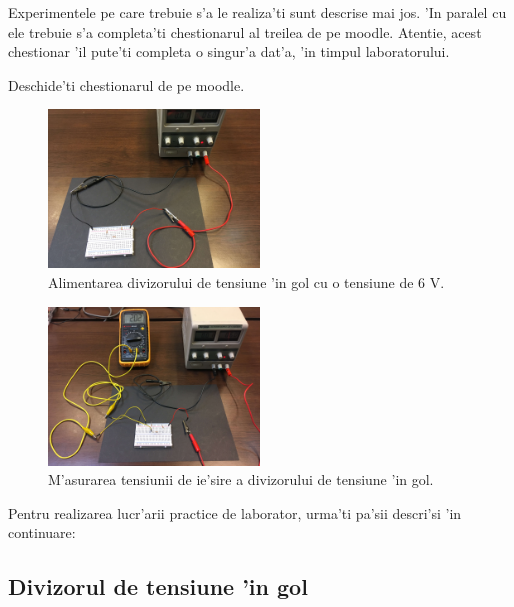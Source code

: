 Experimentele pe care trebuie s'a le realiza'ti sunt descrise mai jos. 'In paralel cu ele trebuie s'a completa'ti chestionarul al treilea de pe moodle. Atentie, acest chestionar 'il pute'ti completa o singur'a dat'a, 'in timpul laboratorului.

\begin{exercise}[La laborator]
	Deschide'ti chestionarul de pe moodle.
\end{exercise}

\begin{figure}[!b]
	\centering
		\includegraphics[width=0.5\textwidth]{figuri/4_divizor_gol_alimentat}
	\caption{Alimentarea divizorului de tensiune 'in gol cu o tensiune de 6 V.}
	\label{fig:4_divizor_gol_alimentat}
\end{figure}
\begin{figure}[!b]
	\centering
		\includegraphics[width=0.5\textwidth]{figuri/4_divizor_gol_tensiune_iesire}
	\caption{M'asurarea tensiunii de ie'sire a divizorului de tensiune 'in gol.}
	\label{fig:4_divizor_gol_tensiune_iesire}
\end{figure}

Pentru realizarea lucr'arii practice de laborator, urma'ti pa'sii descri'si 'in continuare:

\subsection{Divizorul de tensiune 'in gol}

